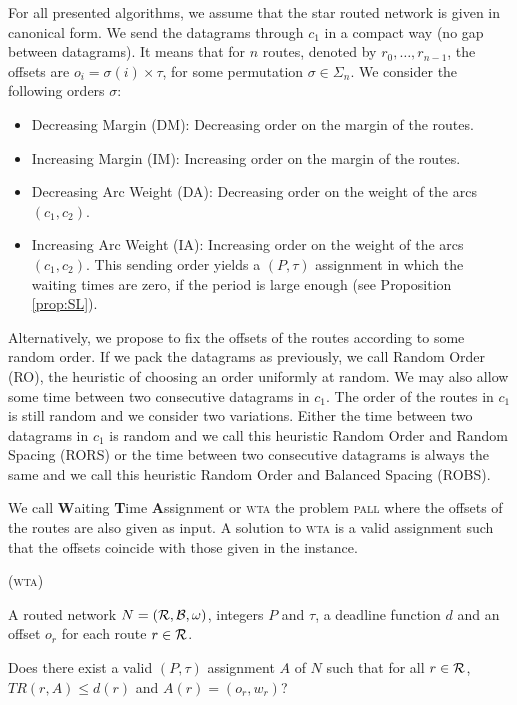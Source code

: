 \documentclass[a4paper,10pt]{journal}
\newcommand\pall{\textsc{pall}\xspace}
\newcommand\wta{\textsc{wta}\xspace}
\begin{document}
     For all presented algorithms, we assume that the star routed network is given in canonical form. 
      We send the datagrams through $c_1$ in a compact way (no gap between datagrams). It means that for $n$ routes, denoted by $r_0, \dots, r_{n-1}$, the offsets are $o_i = \sigma(i) \times \tau$, for some permutation $\sigma \in \Sigma_n$. We consider the following orders $\sigma$: 
	
	\begin{itemize}
	 \item Decreasing Margin (DM): Decreasing order on the margin of the routes.
	 \item Increasing Margin (IM): Increasing order on the margin of the routes. 
	 \item Decreasing Arc Weight (DA): Decreasing order on the weight of the arcs $(c_1,c_2)$.
	 \item Increasing Arc Weight (IA): Increasing order on the weight of the arcs $(c_1,c_2)$. This sending order yields a $(P,\tau)$ assignment in which the waiting times are zero, if the period is large enough (see Proposition \ref{prop:SL}).
	\end{itemize}

    Alternatively, we propose to fix the offsets of the routes according to some random order.
    If we pack the datagrams as previously, we call Random Order (RO), the heuristic of choosing an order
    uniformly at random. We may also allow some time between two consecutive datagrams in $c_1$. The order of the routes in $c_1$ is still random and we consider two variations. Either the time between two datagrams in $c_1$ is random and we call this heuristic Random Order and Random Spacing (RORS) or the time between two consecutive datagrams is always the same and we call this heuristic Random Order and Balanced Spacing (ROBS).
 	
 	We call \textbf{W}aiting \textbf{T}ime \textbf{A}ssignment or \wta the problem \pall where the offsets of the routes are also given as input. A solution to \wta
 	is a valid assignment such that the offsets coincide with those given in the instance. 


 \bigskip

      (\wta)

        A routed network $N=({\cal R},{\cal B},\omega)$, integers $P$ and $\tau$, a deadline function $d$ and an offset $o_r$ for each route $r \in {\cal R}$.
      
       Does there exist a valid $(P,\tau)$ assignment $A$ of $N$ such that for all $r \in {\cal R}$, $TR(r,A) \leq d(r)$ and $A(r) = (o_r,w_r)$?
      \bigskip
\end{document}
